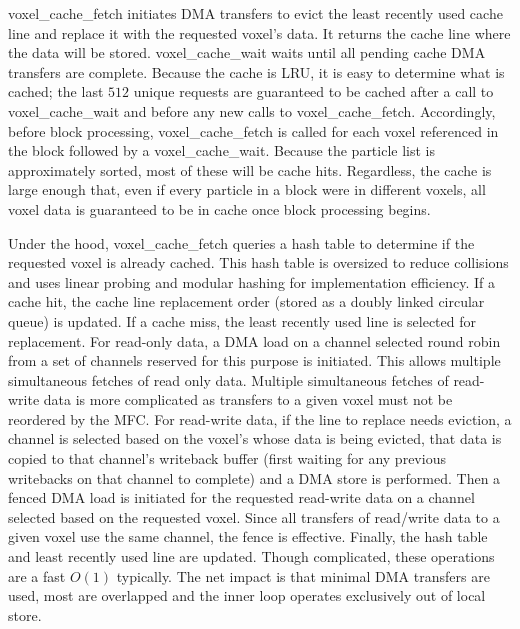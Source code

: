 \documentclass[letter,10pt]{article}
\begin{document}
voxel\_cache\_fetch initiates DMA transfers to evict the least
recently used cache line and replace it with the requested voxel's
data.  It returns the cache line where the data will be stored.
voxel\_cache\_wait waits until all pending cache DMA transfers are
complete.  Because the cache is LRU, it is easy to determine what is
cached; the last $512$ unique requests are guaranteed to be cached
after a call to voxel\_cache\_wait and before any new calls to
voxel\_cache\_fetch.  Accordingly, before block processing,
voxel\_cache\_fetch is called for each voxel referenced in the block
followed by a voxel\_cache\_wait.  Because the particle list is
approximately sorted, most of these will be cache hits.  Regardless,
the cache is large enough that, even if every particle in a block were
in different voxels, all voxel data is guaranteed to be in cache once
block processing begins.

Under the hood, voxel\_cache\_fetch queries a hash table to determine
if the requested voxel is already cached.  This hash table is
oversized to reduce collisions and uses linear probing and modular
hashing for implementation efficiency.  If a cache hit, the cache line
replacement order (stored as a doubly linked circular queue) is
updated.  If a cache miss, the least recently used line is selected
for replacement.  For read-only data, a DMA load on a channel selected
round robin from a set of channels reserved for this purpose is
initiated.  This allows multiple simultaneous fetches of read only
data.  Multiple simultaneous fetches of read-write data is more
complicated as transfers to a given voxel must not be reordered by the
MFC.  For read-write data, if the line to replace needs eviction, a
channel is selected based on the voxel's whose data is being evicted,
that data is copied to that channel's writeback buffer (first waiting
for any previous writebacks on that channel to complete) and a DMA
store is performed.  Then a fenced DMA load is initiated for the
requested read-write data on a channel selected based on the requested
voxel.  Since all transfers of read/write data to a given voxel use
the same channel, the fence is effective.  Finally, the hash table and
least recently used line are updated.  Though complicated, these
operations are a fast $O(1)$ typically.  The net impact is that minimal 
DMA transfers are used, most are overlapped and the inner
loop operates exclusively out of local store.

\end{document}
